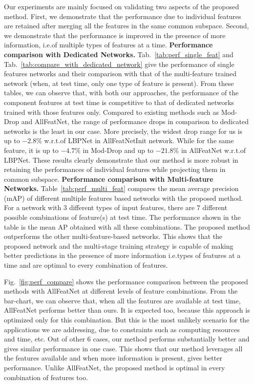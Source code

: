 \documentclass{sig-alternate-05-2015}
\begin{document}
Our experiments are mainly focused on validating two aspects of the proposed method. First, we demonstrate that the performance due to individual features are retained after merging all the features in the same common subspace. Second, we demonstrate that the performance is improved in the presence of more information, i.e.\presence of multiple types of features at a time.
\textbf{Performance comparison with Dedicated Networks.}
Tab.~\ref{tab:perf_single_feat} and Tab.~\ref{tab:compare_with_dedicated_network} give the performance of single features networks and  their comparison with that of the multi-feature trained network (when, at  test time, only one type of feature is present). From these tables, we can observe that, with both our approaches, the performance of the component features at test time is competitive to that of dedicated networks trained with those features only.  
Compared to existing methods such as Mod-Drop and AllFeatNet, the range of  performance drops in comparison to dedicated networks is the least in our case. More precisely, the widest drop range for us is up to $-2.8\%$ w.r.t.\that of LBPNet in AllFeatNetInit network. While for the same feature, it is up to $-4.7\%$ in Mod-Drop and up to $-21.8\%$ in AllFeatNet w.r.t.\that of LBPNet. These results clearly 
demonstrate that our method is more robust in retaining the performances of individual features while projecting them in common subspace.
\textbf{Performance comparison with Multi-feature Networks.}
Table~\ref{tab:perf_multi_feat} compares the mean average precision (mAP) of different multiple features based networks with the proposed method. For a network with $3$ different types of input features, there are $7$ different possible combinations of feature(s) at test time. The performance shown in the table is the mean AP obtained with all these combinations. The proposed method outperforms the other multi-feature-based networks. This shows that the proposed network and the multi-stage training strategy is capable of making better predictions in the presence of more information i.e.\multiple types of features at a time and are optimal to every combination of features. 

Fig.~\ref{fig:perf_compare} shows the performance comparison between the proposed methods with AllFeatNet at different levels of feature combinations. From the bar-chart, we can observe that, when all the features are available at  test time, AllFeatNet performs better than ours. It is expected too, because this approach is optimized only for this combination. But this is the most unlikely scenario for the applications we are addressing, due to constraints such as computing resources and time, etc. Out of other $6$ cases, our method performs substantially better and gives similar performance in one case. This shows that our method leverages all the features available and when more information is present, gives better performance. Unlike AllFeatNet, the proposed method is optimal in every combination of features too.
\end{document}
